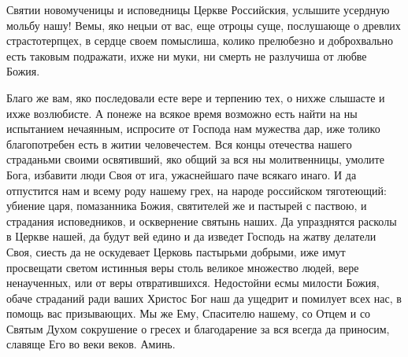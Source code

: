 \mychapterending


\begin{mymulticols}




Святии новомученицы и исповедницы Церкве Российския, услышите усердную мольбу нашу! Вемы, яко нецыи от вас, еще отроцы суще, послушающе о древлих страстотерпцех, в сердце своем помыслиша, колико прелюбезно и доброхвально есть таковым подражати, ихже ни муки, ни смерть не разлучиша от любве Божия.


Благо же вам, яко последовали есте вере и терпению тех, о нихже слышасте и ихже возлюбисте. А понеже на всякое время возможно есть найти на ны испытанием нечаянным, испросите от Господа нам мужества дар, иже толико благопотребен есть в житии человечестем. Вся концы отечества нашего страданьми своими освятивший, яко общий за вся ны молитвенницы, умолите Бога, избавити люди Своя от ига, ужаснейшаго паче всякаго инаго. И да отпустится нам и всему роду нашему грех, на народе российском тяготеющий: убиение царя, помазанника Божия, святителей же и пастырей с паствою, и страдания исповедников, и осквернение святынь наших. Да упразднятся расколы в Церкве нашей, да будут вей едино и да изведет Господь на жатву делатели Своя, сиесть да не оскудевает Церковь пастырьми добрыми, иже имут просвещати светом истинныя веры столь великое множество людей, вере ненаученных, или от веры отвратившихся. Недостойни есмы милости Божия, обаче страданий ради ваших Христос Бог наш да ущедрит и помилует всех нас, в помощь вас призывающих. Мы же Ему, Спасителю нашему, со Отцем и со Святым Духом сокрушение о гресех и благодарение за вся всегда да приносим, славяще Его во веки веков. Аминь.

\end{mymulticols}

\mychapterending



